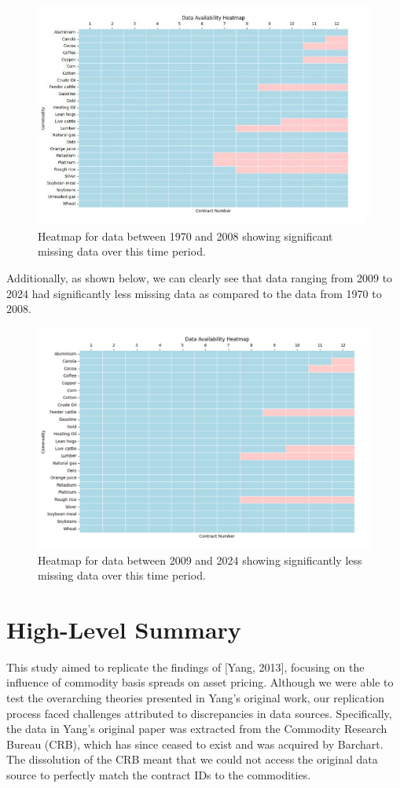 \documentclass{article}
\begin{document}
\begin{figure}[h]
  \centering
  \includegraphics[width=0.5\linewidth]{assets/1970_heat.jpg}
  \caption{Heatmap for data between 1970 and 2008 showing significant missing data over this time period.}
  \label{fig:my_graph}
\end{figure}

Additionally, as shown below, we can clearly see that data ranging from 2009 to 2024 had significantly less missing data as compared to the data from 1970 to 2008.

\begin{figure}[h]
  \centering
  \includegraphics[width=0.5\linewidth]{assets/2009_heat.png}
  \caption{Heatmap for data between 2009 and 2024 showing significantly less missing data over this time period.}
  \label{fig:my_graph}
\end{figure}

\section{High-Level Summary}

This study aimed to replicate the findings of [Yang, 2013], focusing on the influence of commodity basis spreads on asset pricing. Although we were able to test the overarching theories presented in Yang’s original work, our replication process faced challenges attributed to discrepancies in data sources. Specifically, the data in Yang's original paper was extracted from the Commodity Research Bureau (CRB), which has since ceased to exist and was acquired by Barchart. The dissolution of the CRB meant that we could not access the original data source to perfectly match the contract IDs to the commodities.
\end{document}
